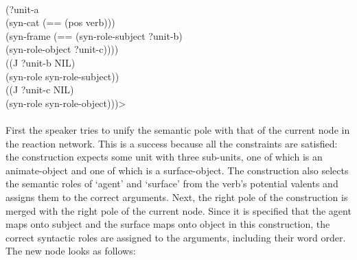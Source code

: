 {{\\ \hspace*{2mm}(?unit-a
\\ \hspace*{5mm} (syn-cat (== (pos verb)))
\\ \hspace*{5mm} (syn-frame (== (syn-role-subject ?unit-b)
\\ \hspace*{36mm}(syn-role-object ?unit-c))))
\\ \hspace*{2mm}((J ?unit-b NIL)
\\ \hspace*{5mm} (syn-role syn-role-subject))
\\ \hspace*{2mm}((J ?unit-c NIL) 
\\ \hspace*{5mm} (syn-role syn-role-object)))>}}
\\
\\
First the speaker tries to unify the semantic pole with that of the current node in the reaction network. This is a success because all the constraints are satisfied: the construction expects some unit with three sub-units, one of which is an animate-object and one of which is a surface-object. The construction also selects the semantic roles of `agent' and `surface' from the verb's potential valents and assigns them to the correct arguments. Next, the right pole of the construction is merged with the right pole of the current node. Since it is specified that the agent maps onto subject and the surface maps onto object in this construction, the correct syntactic roles are assigned to the arguments, including their word order. The new node looks as follows:
\\
\\
